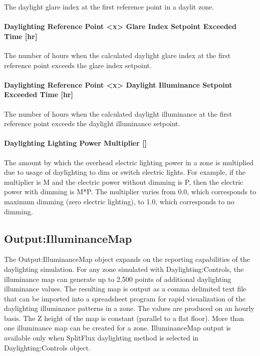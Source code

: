 The daylight glare index at the first reference point in a daylit zone.

\paragraph{Daylighting Reference Point <x> Glare Index Setpoint Exceeded Time {[}hr{]}}\label{daylighting-reference-point-1-glare-index-setpoint-exceeded-time-hr}

The number of hours when the calculated daylight glare index at the first reference point exceeds the glare index setpoint.

\paragraph{Daylighting Reference Point <x> Daylight Illuminance Setpoint Exceeded Time {[}hr{]}}\label{daylighting-reference-point-1-daylight-illuminance-setpoint-exceeded-time-hr}

The number of hours when the calculated daylight illuminance at the first reference point exceeds the daylight illuminance setpoint.

\paragraph{Daylighting Lighting Power Multiplier {[]}}\label{daylighting-lighting-power-multiplier-1}

The amount by which the overhead electric lighting power in a zone is multiplied due to usage of daylighting to dim or switch electric lights. For example, if the multiplier is M and the electric power without dimming is P, then the electric power with dimming is M*P. The multiplier varies from 0.0, which corresponds to maximum dimming (zero electric lighting), to 1.0, which corresponds to no dimming.

\subsection{Output:IlluminanceMap}\label{outputilluminancemap}

The Output:IlluminanceMap object expands on the reporting capabilities of the daylighting simulation. For any zone simulated with Daylighting:Controls, the illuminance map can generate up to 2,500 points of additional daylighting illuminance values. The resulting map is output as a comma delimited text file that can be imported into a spreadsheet program for rapid visualization of the daylighting illuminance patterns in a zone. The values are produced on an hourly basis. The Z height of the map is constant (parallel to a flat floor). More than one illuminance map can be created for a zone. IlluminanceMap output is available only when SplitFlux daylighting method is selected in Daylighting:Controls object. 

